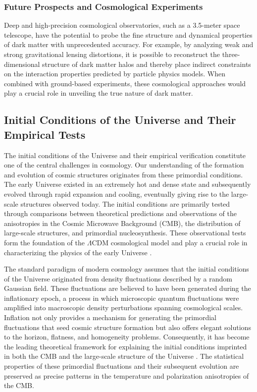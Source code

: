 \subsubsection{Future Prospects and Cosmological Experiments}

Deep and high-precision cosmological observatories, such as a 3.5-meter space telescope, have the potential to probe the fine structure and dynamical properties of dark matter with unprecedented accuracy. For example, by analyzing weak and strong gravitational lensing distortions, it is possible to reconstruct the three-dimensional structure of dark matter halos and thereby place indirect constraints on the interaction properties predicted by particle physics models. When combined with ground-based experiments, these cosmological approaches would play a crucial role in unveiling the true nature of dark matter.

\subsection{Initial Conditions of the Universe and Their Empirical Tests}\label{initial-conditions-of-the-universe-and-their-empirical-tests}

The initial conditions of the Universe and their empirical verification constitute one of the central challenges in cosmology. Our understanding of the formation and evolution of cosmic structures originates from these primordial conditions. The early Universe existed in an extremely hot and dense state and subsequently evolved through rapid expansion and cooling, eventually giving rise to the large-scale structures observed today. The initial conditions are primarily tested through comparisons between theoretical predictions and observations of the anisotropies in the Cosmic Microwave Background (CMB), the distribution of large-scale structures, and primordial nucleosynthesis. These observational tests form the foundation of the $\Lambda$CDM cosmological model and play a crucial role in characterizing the physics of the early Universe \cite{akrami2020}.

The standard paradigm of modern cosmology assumes that the initial conditions of the Universe originated from density fluctuations described by a random Gaussian field. These fluctuations are believed to have been generated during the inflationary epoch, a process in which microscopic quantum fluctuations were amplified into macroscopic density perturbations spanning cosmological scales. Inflation not only provides a mechanism for generating the primordial fluctuations that seed cosmic structure formation but also offers elegant solutions to the horizon, flatness, and homogeneity problems. Consequently, it has become the leading theoretical framework for explaining the initial conditions imprinted in both the CMB and the large-scale structure of the Universe \cite{baumann2011}. The statistical properties of these primordial fluctuations and their subsequent evolution are preserved as precise patterns in the temperature and polarization anisotropies of the CMB.

